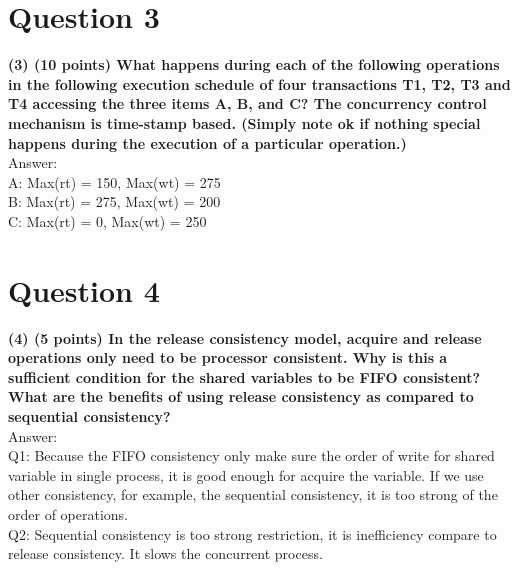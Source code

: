 \documentclass{article}
\begin{document}
\clearpage
\section{Question 3}
\textbf{(3)	(10 points) What happens during each of the following operations in the following execution schedule of four transactions T1, T2, T3 and T4 accessing the three items A, B, and C? The concurrency control mechanism is time-stamp based. (Simply note ok if nothing special happens during the execution of a particular operation.)}\\

Answer:\\
A: Max(rt) = 150, Max(wt) = 275\\
B: Max(rt) = 275, Max(wt) = 200\\
C: Max(rt) = 0, Max(wt) = 250\\

\clearpage
\section{Question 4}
\textbf{(4)	(5 points) In the release consistency model, acquire and release operations only need to be processor consistent. Why is this a sufficient condition for the shared variables to be FIFO consistent? What are the benefits of using release consistency as compared to sequential consistency?}\\

Answer:\\

Q1: Because the FIFO consistency only make sure the order of write for shared variable in single process, it is good enough for acquire the variable. If we use other consistency, for example, the sequential consistency, it is too strong of the order of operations.\\

Q2: Sequential consistency is too strong restriction, it is inefficiency compare to release consistency. It slows the concurrent process.
\clearpage
\end{document}
